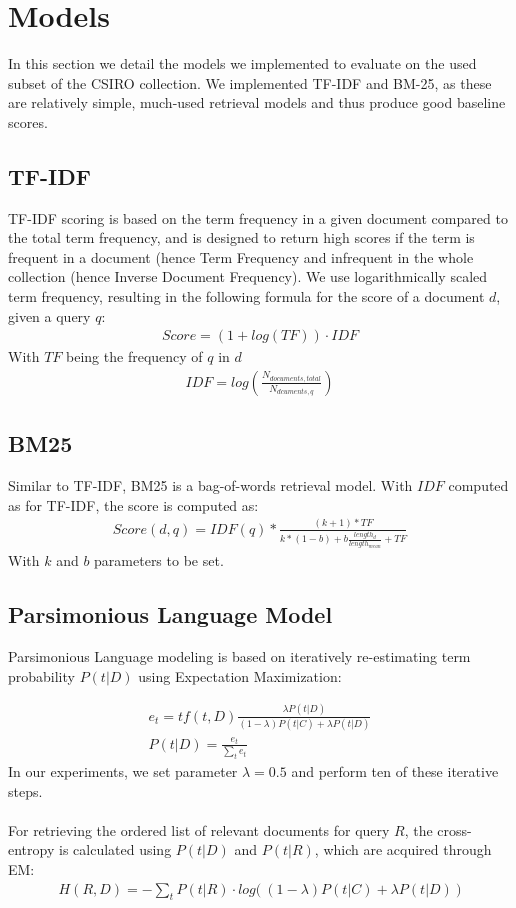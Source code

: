 \documentclass{article}
\begin{document}
\section*{Models}
In this section we detail the models we implemented to evaluate on the used subset of the CSIRO collection. We implemented TF-IDF and BM-25, as these are relatively simple, much-used retrieval models and thus produce good baseline scores.
\subsection*{TF-IDF}
TF-IDF scoring is based on the term frequency in a given document compared to the total term frequency, and is designed to return high scores if the term is frequent in a document (hence Term Frequency and infrequent in the whole collection (hence Inverse Document Frequency). We use logarithmically scaled term frequency, resulting in the following formula for the score of a document $d$, given a query $q$:
\begin{align*}
Score = (1+log(TF))\cdot IDF
\end{align*}
With $TF$ being the frequency of $q$ in $d$
\begin{align*}
IDF = log(\frac{N_{documents, total}}{N_{dcuments, q}})
\end{align*}
\subsection*{BM25}
Similar to TF-IDF, BM25 is a bag-of-words retrieval model. With $IDF$ computed as for TF-IDF, the score is computed as:
\begin{align*}
Score(d,q) = IDF(q) * \frac{(k+1)*TF}{k*(1-b)+b\frac{length_d}{length_{mean}}+TF}
\end{align*}
With $k$ and $b$ parameters to be set.

\subsection*{Parsimonious Language Model}

Parsimonious Language modeling is based on iteratively re-estimating term probability $P(t|D)$ using Expectation Maximization:

\begin{align*}
e_t = tf(t,D)\frac{\lambda P(t|D)}{(1-\lambda)P(t|C)+\lambda P(t|D)} \\
P(t|D) = \frac{e_t}{\sum_t e_t}
\end{align*}
In our experiments, we set parameter $\lambda = 0.5$ and perform ten of these iterative steps.\\ \\
For retrieving the ordered list of relevant documents for query $R$, the cross-entropy is calculated using $P(t|D)$ and $P(t|R)$, which are acquired through EM:
\begin{align*}
H(R,D) = -\sum_t P(t|R)\cdot log\big( \ (1-\lambda)P(t|C)+\lambda P(t|D) \ \big)
\end{align*}
\end{document}
